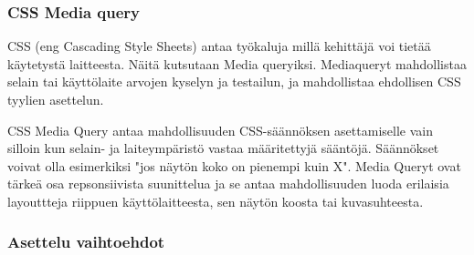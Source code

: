 \documentclass[11pt,a4paper,titlepage,oneside]{article}
\begin{document}
\subsubsection{CSS Media query}


CSS (eng Cascading Style Sheets) antaa työkaluja millä kehittäjä voi tietää käytetystä laitteesta.
Näitä kutsutaan Media queryiksi.
Mediaqueryt mahdollistaa selain tai käyttölaite arvojen kyselyn ja testailun, ja mahdollistaa ehdollisen CSS tyylien asettelun.

\medskip




CSS Media Query antaa mahdollisuuden CSS-säännöksen asettamiselle vain silloin kun selain- ja laiteympäristö vastaa määritettyjä sääntöjä. 
Säännökset voivat olla esimerkiksi "jos näytön koko on pienempi kuin X".
Media Queryt ovat tärkeä osa repsonsiivista suunittelua ja se antaa mahdollisuuden luoda erilaisia layouttteja riippuen käyttölaitteesta,
sen näytön koosta tai kuvasuhteesta.












\subsubsection{Asettelu vaihtoehdot}


%

\end{document}
